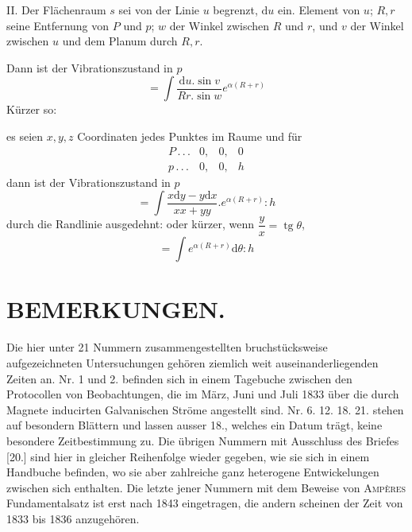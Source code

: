 
II. Der Flächenraum $s$ sei von der Linie $u$ begrenzt, $\mathrm du$ ein. Element von $u$; $R,r$ seine Entfernung von $P$ und $p$; $w$ der Winkel zwischen $R$ und $r$, und $v$ der Winkel zwischen $u$ und dem Planum durch $R,r$.

Dann ist der Vibrationszustand in $p$
\[
=\int\frac{\mathrm du.\sin v}{Rr.\sin w}e^{\alpha(R+r)}
\]
Kürzer so:

es seien $x,y,z$ Coordinaten jedes Punktes im Raume und für
\[
\begin{array}{lccc}
P\, .\, .\, .&0,&0,&0\\
p\, .\, .\, .&0,&0,&h
\end{array}
\]
dann ist der Vibrationszustand in $p$
\[
=\int\frac{x\mathrm dy-y\mathrm dx}{xx+yy}.e^{\alpha(R+r)}:h
\]
durch die Randlinie ausgedehnt: oder kürzer, wenn $\dfrac yx=\operatorname{tg}\theta$,
\[
=\int e^{\alpha(R+r)}\mathrm d\theta:h
\]

\section*{BEMERKUNGEN.}

Die hier unter 21 Nummern zusammengestellten bruchstücksweise aufgezeichneten Untersuchungen gehören ziemlich weit auseinanderliegenden Zeiten an. Nr. 1 und 2. befinden sich in einem Tagebuche zwischen den Protocollen von Beobachtungen, die im März, Juni und Juli 1833 über die durch Magnete inducirten Galvanischen Ströme angestellt sind. Nr. 6. 12. 18. 21. stehen auf besondern Blättern und lassen ausser 18., welches ein Datum trägt, keine besondere Zeitbestimmung zu. Die übrigen Nummern mit Ausschluss des Briefes [20.] sind hier in gleicher Reihenfolge wieder gegeben, wie sie sich in einem Handbuche befinden, wo sie aber zahlreiche ganz heterogene Entwickelungen zwischen sich enthalten. Die letzte jener Nummern mit dem Beweise von \textsc{Ampères} Fundamentalsatz ist erst nach 1843 eingetragen, die andern scheinen der Zeit von 1833 bis 1836 anzugehören.


